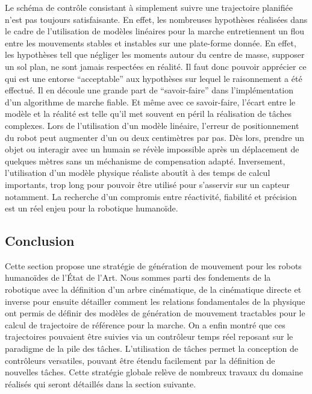 Le schéma de contrôle consistant à simplement suivre une trajectoire
planifiée n'est pas toujours satisfaisante. En effet, les nombreuses
hypothèses réalisées dans le cadre de l'utilisation de modèles
linéaires pour la marche entretiennent un flou entre les mouvements
stables et instables sur une plate-forme donnée. En effet, les
hypothèses tell que négliger les moments autour du centre de masse,
supposer un sol plan, ne sont jamais respectées en réalité. Il faut
donc pouvoir apprécier ce qui est une entorse ``acceptable'' aux
hypothèses sur lequel le raisonnement a été effectué. Il en découle
une grande part de ``savoir-faire'' dans l'implémentation d'un
algorithme de marche fiable. Et même avec ce savoir-faire, l'écart
entre le modèle et la réalité est telle qu'il met souvent en péril la
réalisation de tâches complexes. Lors de l'utilisation d'un modèle
linéaire, l'erreur de positionnement du robot peut augmenter d'un ou
deux centimètres par pas. Dès lors, prendre un objet ou interagir avec
un humain se révèle impossible après un déplacement de quelques mètres
sans un méchanisme de compensation adapté. Inversement, l'utilisation
d'un modèle physique réaliste aboutît à des temps de calcul
importants, trop long pour pouvoir être utilisé pour s'asservir sur un
capteur notamment. La recherche d'un compromis entre réactivité,
fiabilité et précision est un réel enjeu pour la robotique humanoïde.


\subsection{Conclusion}

Cette section propose une stratégie de génération de mouvement pour
les robots humanoïdes de l'État de l'Art. Nous sommes parti des
fondements de la robotique avec la définition d'un arbre cinématique,
de la cinématique directe et inverse pour ensuite détailler comment
les relations fondamentales de la physique ont permis de définir des
modèles de génération de mouvement tractables pour le calcul de
trajectoire de référence pour la marche. On a enfin montré que ces
trajectoires pouvaient être suivies via un contrôleur temps réel
reposant sur le paradigme de la pile des tâches. L'utilisation de
tâches permet la conception de contrôleurs versatiles, pouvant être
étendu facilement par la définition de nouvelles tâches. Cette
stratégie globale relève de nombreux travaux du domaine réalisés qui
seront détaillés dans la section suivante.



